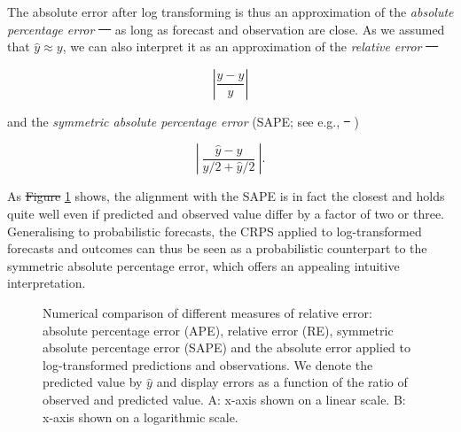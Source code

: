 \documentclass[10pt,letterpaper]{article} %
\providecommand{\DIFaddtex}[1]{{\protect\color{blue}\uwave{#1}}} %
\providecommand{\DIFdeltex}[1]{{\protect\color{red}\sout{#1}}}                      %
\providecommand{\DIFaddbegin}{} %
\providecommand{\DIFaddend}{} %
\providecommand{\DIFdelbegin}{} %
\providecommand{\DIFdelend}{} %
\providecommand{\DIFdelbeginFL}{} %
\providecommand{\DIFdelendFL}{} %
\providecommand{\DIFadd}[1]{\texorpdfstring{\DIFaddtex{#1}}{#1}} %
\providecommand{\DIFdel}[1]{\texorpdfstring{\DIFdeltex{#1}}{}} %
\newcommand{\DIFscaledelfig}{0.5}
\newlength{\DIFdelgraphicswidth} %
\newlength{\DIFdelgraphicsheight} %
\newcommand{\DIFaddincludegraphics}[2][]{{\color{blue}\fbox{\DIFOincludegraphics[#1]{#2}}}} %
\newcommand{\DIFdelincludegraphics}[2][]{%
\sbox{\DIFdelgraphicsbox}{\DIFOincludegraphics[#1]{#2}}%
\settoboxwidth{\DIFdelgraphicswidth}{\DIFdelgraphicsbox} %
\settoboxtotalheight{\DIFdelgraphicsheight}{\DIFdelgraphicsbox} %
\scalebox{\DIFscaledelfig}{%
\parbox[b]{\DIFdelgraphicswidth}{\usebox{\DIFdelgraphicsbox}\\[-\baselineskip] \rule{\DIFdelgraphicswidth}{0em}}\llap{\resizebox{\DIFdelgraphicswidth}{\DIFdelgraphicsheight}{%
\setlength{\unitlength}{\DIFdelgraphicswidth}%
\begin{picture}(1,1)%
\thicklines\linethickness{2pt} %
{\color[rgb]{1,0,0}\put(0,0){\framebox(1,1){}}}%
{\color[rgb]{1,0,0}\put(0,0){\line( 1,1){1}}}%
{\color[rgb]{1,0,0}\put(0,1){\line(1,-1){1}}}%
\end{picture}%
}\hspace*{3pt}}} %
} %
\DeclareRobustCommand{\DIFaddbegin}{\DIFOaddbegin \let\includegraphics\DIFaddincludegraphics} %
\DeclareRobustCommand{\DIFaddend}{\DIFOaddend \let\includegraphics\DIFOincludegraphics} %
\DeclareRobustCommand{\DIFdelbegin}{\DIFOdelbegin \let\includegraphics\DIFdelincludegraphics} %
\DeclareRobustCommand{\DIFdelend}{\DIFOaddend \let\includegraphics\DIFOincludegraphics} %
\DeclareRobustCommand{\DIFdelbeginFL}{\DIFOdelbeginFL \let\includegraphics\DIFdelincludegraphics} %
\DeclareRobustCommand{\DIFdelendFL}{\DIFOaddendFL \let\includegraphics\DIFOincludegraphics} %
\begin{document}
The absolute error after log transforming is thus an approximation of the \textit{absolute percentage error} \DIFdelbegin \DIFdel{\mbox{%
\citep[APE,][]{gneitingMakingEvaluatingPoint2011a} }\hskip0pt%
}\DIFdelend \DIFaddbegin \DIFadd{(APE,~ \mbox{%
\cite{gneitingMakingEvaluatingPoint2011a}}\hskip0pt%
) }\DIFaddend as long as forecast and observation are close. As we assumed that $\hat{y} \approx y$, we can also interpret it as an approximation of the \textit{relative error} \DIFdelbegin \DIFdel{\mbox{%
\citep[RE,][]{gneitingMakingEvaluatingPoint2011a}
}\hskip0pt%
}\DIFdelend \DIFaddbegin \DIFadd{(RE,~\mbox{%
\cite{gneitingMakingEvaluatingPoint2011a}}\hskip0pt%
)
}\DIFaddend \begin{linenomath*}
\begin{equation}
\left| \frac{\hat{y} - y}{\hat{y}} \right|
\end{equation}
\end{linenomath*}
and the \textit{symmetric absolute percentage error} (SAPE; see e.g., \DIFdelbegin \DIFdel{\mbox{%
\citealt{Flores1986}}\hskip0pt%
}\DIFdelend \DIFaddbegin \DIFadd{\mbox{%
\cite{Flores1986}}\hskip0pt%
}\DIFaddend )
\begin{linenomath*}
\begin{equation}
\left| \ \frac{\hat{y} - y}{y/2 + \hat{y}/2} \ \right|.
\end{equation}
\end{linenomath*}
As \DIFdelbegin \DIFdel{Figure }\DIFdelend \DIFaddbegin \DIFadd{Fig }\DIFaddend \ref{fig:SAPE} shows, the alignment with the SAPE is in fact the closest and holds quite well even if predicted and observed value differ by a factor of two or three. Generalising to probabilistic forecasts, the CRPS applied to log-transformed forecasts and outcomes can thus be seen as a probabilistic counterpart to the symmetric absolute percentage error, which offers an appealing intuitive interpretation.

\begin{figure}[h!]
\centering
\DIFdelbeginFL %
\DIFdelendFL \caption{Numerical comparison of different measures of relative error: absolute percentage error (APE), relative error (RE), symmetric absolute percentage error (SAPE) and the absolute error applied to log-transformed predictions and observations. We denote the predicted value by $\hat{y}$ and display errors as a function of the ratio of observed and predicted value. A: x-axis shown on a linear scale. B: x-axis shown on a logarithmic scale.}
\label{fig:SAPE}
\end{figure}
\end{document}

